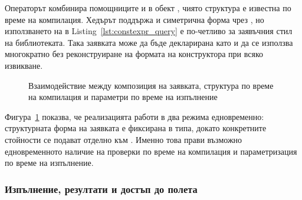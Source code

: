 Операторът \code{\&} комбинира помощниците  и  в обект , чиято структура е известна по време на компилация. Хедърът  поддържа и симетрична форма чрез \code{*}, но използването на \code{\&} в Listing~\ref{lst:constexpr_query} е по-четливо за заявъчния стил на библиотеката. Така заявката може да бъде декларирана като  и да се използва многократно без реконструиране на формата на конструктора при всяко извикване.

\begin{figure}[H]
\centering
{}
\caption{Взаимодействие между композиция на заявката, структура по време на компилация и параметри по време на изпълнение}
\label{fig:query_composition_execution}
\end{figure}

Фигура~\ref{fig:query_composition_execution} показва, че реализацията работи в два режима едновременно: структурната форма на заявката е фиксирана в типа, докато конкретните стойности се подават отделно към . Именно това прави възможно едновременното наличие на проверки по време на компилация и параметризация по време на изпълнение.

\subsubsection{Изпълнение, резултати и достъп до полета}

